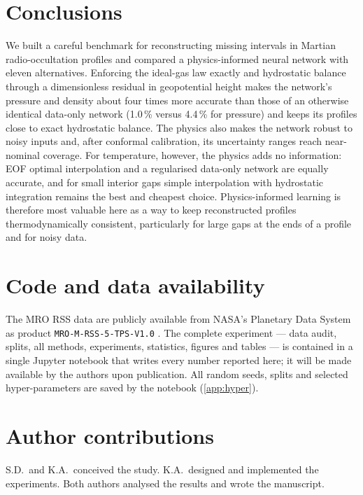 \documentclass[11pt,a4paper]{article}
\begin{document}
\section{Conclusions}\label{sec:conclusion}
We built a careful benchmark for reconstructing missing intervals in Martian radio-occultation profiles and compared a physics-informed neural network with eleven alternatives. Enforcing the ideal-gas law exactly and hydrostatic balance through a dimensionless residual in geopotential height makes the network's pressure and density about four times more accurate than those of an otherwise identical data-only network (1.0\,\% versus 4.4\,\% for pressure) and keeps its profiles close to exact hydrostatic balance. The physics also makes the network robust to noisy inputs and, after conformal calibration, its uncertainty ranges reach near-nominal coverage. For temperature, however, the physics adds no information: EOF optimal interpolation and a regularised data-only network are equally accurate, and for small interior gaps simple interpolation with hydrostatic integration remains the best and cheapest choice. Physics-informed learning is therefore most valuable here as a way to keep reconstructed profiles thermodynamically consistent, particularly for large gaps at the ends of a profile and for noisy data.

\section*{Code and data availability}
The MRO RSS data are publicly available from NASA's Planetary Data System as product \texttt{MRO-M-RSS-5-TPS-V1.0} \citep{hinsonPDS}. The complete experiment --- data audit, splits, all methods, experiments, statistics, figures and tables --- is contained in a single Jupyter notebook that writes every number reported here; it will be made available by the authors upon publication. All random seeds, splits and selected hyper-parameters are saved by the notebook (\cref{app:hyper}).

\section*{Author contributions}
S.D.\ and K.A.\ conceived the study. K.A.\ designed and implemented the experiments. Both authors analysed the results and wrote the manuscript.
\end{document}

